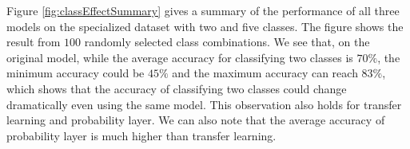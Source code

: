 \documentclass[pageno]{jpaper}
\begin{document}

Figure \ref{fig:classEffectSummary} gives a summary of the performance of all three models on the specialized dataset with two and five classes. The figure shows the result from $100$ randomly selected class combinations. We see that, on the original model, while the average accuracy for classifying two classes is $70\%$, the minimum accuracy could be $45\%$ and the maximum accuracy can reach $83\%$, which shows that the accuracy of classifying two classes could change dramatically even using the same model. This observation also holds for transfer learning and probability layer. We can also note that the average accuracy of probability layer is much higher than transfer learning. 
\end{document}

